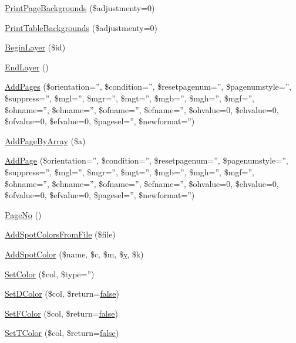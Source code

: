 \begin{DoxyCompactItemize}
\hyperlink{classm_p_d_f_a084e0b2907fbdd3faa3737affc91c7f9}{Print\-Page\-Backgrounds} (\$adjustmenty=0)
\item 
\hyperlink{classm_p_d_f_acaf1acd5442bec1e0974085f0dc223c5}{Print\-Table\-Backgrounds} (\$adjustmenty=0)
\item 
\hyperlink{classm_p_d_f_a6c4d668ca6cf7d73dde7531d343e1afe}{Begin\-Layer} (\$id)
\item 
\hyperlink{classm_p_d_f_a9a015e97e0f91978b0a0bae87de44237}{End\-Layer} ()
\item 
\hyperlink{classm_p_d_f_a3e2d00c3ee44e41fd758a25ee7bf30e1}{Add\-Pages} (\$orientation='', \$condition='', \$resetpagenum='', \$pagenumstyle='', \$suppress='', \$mgl='', \$mgr='', \$mgt='', \$mgb='', \$mgh='', \$mgf='', \$ohname='', \$ehname='', \$ofname='', \$efname='', \$ohvalue=0, \$ehvalue=0, \$ofvalue=0, \$efvalue=0, \$pagesel='', \$newformat='')
\item 
\hyperlink{classm_p_d_f_a212a1f096844c5458868d7b4e2e84aaf}{Add\-Page\-By\-Array} (\$a)
\item 
\hyperlink{classm_p_d_f_a9f000e1acd7ddbe2e7ee2562394c04e1}{Add\-Page} (\$orientation='', \$condition='', \$resetpagenum='', \$pagenumstyle='', \$suppress='', \$mgl='', \$mgr='', \$mgt='', \$mgb='', \$mgh='', \$mgf='', \$ohname='', \$ehname='', \$ofname='', \$efname='', \$ohvalue=0, \$ehvalue=0, \$ofvalue=0, \$efvalue=0, \$pagesel='', \$newformat='')
\item 
\hyperlink{classm_p_d_f_a5ca1ef72b014e6af345389266af4c486}{Page\-No} ()
\item 
\hyperlink{classm_p_d_f_adbaeb93e754be5c1d8bee4d56da0302c}{Add\-Spot\-Colors\-From\-File} (\$file)
\item 
\hyperlink{classm_p_d_f_ae762ec1f53323da1b43d7b3a7063a865}{Add\-Spot\-Color} (\$name, \$c, \$m, \$\hyperlink{example43___m_p_d_f_i__booklet_8php_a3f83be162d14f38451e1bc419fbbbcbc}{y}, \$k)
\item 
\hyperlink{classm_p_d_f_ac299f77ec376df64ed4eb6e3ab3014d6}{Set\-Color} (\$col, \$type='')
\item 
\hyperlink{classm_p_d_f_a45efb6fb73e84068eee0d193113ef406}{Set\-D\-Color} (\$col, \$return=\hyperlink{ttfontsuni_8php_afbaa04e5cc97693dc668b3c45d3dd740}{false})
\item 
\hyperlink{classm_p_d_f_a64cd5d4bffd206b41f7135b385634df1}{Set\-F\-Color} (\$col, \$return=\hyperlink{ttfontsuni_8php_afbaa04e5cc97693dc668b3c45d3dd740}{false})
\item 
\hyperlink{classm_p_d_f_ae4c74815e0490a398045aebc7528fbfe}{Set\-T\-Color} (\$col, \$return=\hyperlink{ttfontsuni_8php_afbaa04e5cc97693dc668b3c45d3dd740}{false})

\end{DoxyCompactItemize}
